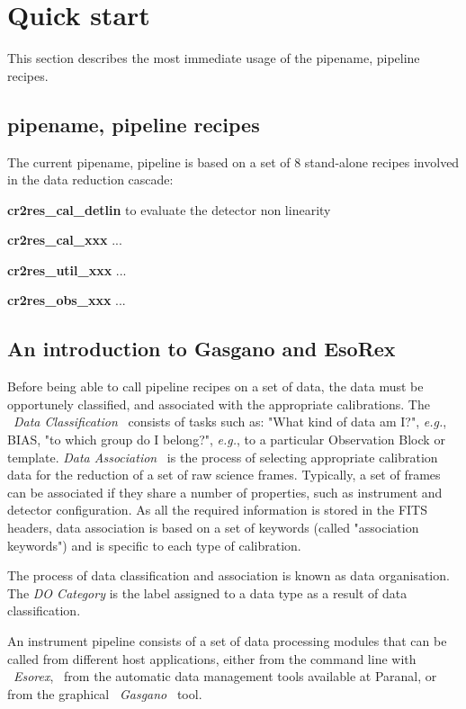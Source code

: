\section{\label{COOK}Quick start}

This section describes the most immediate usage of the pipename, pipeline 
recipes.


\subsection{pipename, pipeline recipes}
\label{RECIPES}
The current pipename, pipeline is based on a set of 8 stand-alone recipes 
involved in the data reduction cascade:

\begin{description}
\item {\bf cr2res\_cal\_detlin} to evaluate the detector non linearity 
\item {\bf cr2res\_cal\_xxx} ...
\item {\bf cr2res\_util\_xxx} ...
\item {\bf cr2res\_obs\_xxx} ...
\end{description}

\subsection{An introduction to Gasgano and EsoRex}
\label{LAUNCH}

Before being able to call pipeline recipes on a set of data, the data 
must be opportunely classified, and associated with the appropriate
calibrations. The \ {\it Data Classification} \ consists of tasks
such as: "What kind of
data am I?", {\it e.g.}, BIAS, "to which group do I belong?",
{\it e.g.}, to a particular Observation Block or template.
{\it Data Association} \ is the process of selecting appropriate
calibration
data for the reduction of a set of raw science frames. Typically, a set
of frames can be associated if they share a number of properties, such as
instrument and detector configuration. As all the required information is
stored in the FITS headers, data association is based on a set of
keywords (called "association keywords") and is specific to each type of
calibration.

The process of data classification and association is 
known as data organisation. The {\it DO Category} is the 
label assigned to a data type as a result of data classification.

An instrument pipeline consists of a set of data processing modules that
can be called from different host applications, either from the command
line with \ {\it Esorex}, \ from the automatic data management tools 
available at Paranal, or from the graphical \ {\it Gasgano} \ tool.

